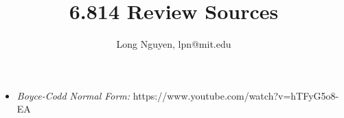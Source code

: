 \documentclass{article}
\title{6.814 Review Sources}
\author{Long Nguyen, lpn@mit.edu}
\begin{document}
\maketitle

\begin{itemize}
	\item \emph{Boyce-Codd Normal Form:} https://www.youtube.com/watch?v=hTFyG5o8-EA
\end{itemize}
\end{document}

